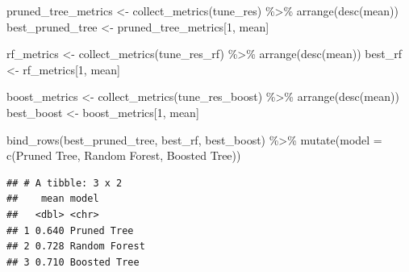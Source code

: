 \documentclass[
]{article}
\newenvironment{Shaded}{\begin{snugshade}}{\end{snugshade}}
\newcommand{\AttributeTok}[1]{\textcolor[rgb]{0.77,0.63,0.00}{#1}}
\newcommand{\DecValTok}[1]{\textcolor[rgb]{0.00,0.00,0.81}{#1}}
\newcommand{\FunctionTok}[1]{\textcolor[rgb]{0.00,0.00,0.00}{#1}}
\newcommand{\NormalTok}[1]{#1}
\newcommand{\OtherTok}[1]{\textcolor[rgb]{0.56,0.35,0.01}{#1}}
\newcommand{\SpecialCharTok}[1]{\textcolor[rgb]{0.00,0.00,0.00}{#1}}
\newcommand{\StringTok}[1]{\textcolor[rgb]{0.31,0.60,0.02}{#1}}
\begin{document}
\begin{Shaded}
\begin{Highlighting}[]
\NormalTok{pruned\_tree\_metrics }\OtherTok{\textless{}{-}} \FunctionTok{collect\_metrics}\NormalTok{(tune\_res) }\SpecialCharTok{\%\textgreater{}\%} \FunctionTok{arrange}\NormalTok{(}\FunctionTok{desc}\NormalTok{(mean))}
\NormalTok{best\_pruned\_tree }\OtherTok{\textless{}{-}}\NormalTok{ pruned\_tree\_metrics[}\DecValTok{1}\NormalTok{, }\StringTok{\textquotesingle{}mean\textquotesingle{}}\NormalTok{]}

\NormalTok{rf\_metrics }\OtherTok{\textless{}{-}} \FunctionTok{collect\_metrics}\NormalTok{(tune\_res\_rf) }\SpecialCharTok{\%\textgreater{}\%} \FunctionTok{arrange}\NormalTok{(}\FunctionTok{desc}\NormalTok{(mean))}
\NormalTok{best\_rf }\OtherTok{\textless{}{-}}\NormalTok{ rf\_metrics[}\DecValTok{1}\NormalTok{, }\StringTok{\textquotesingle{}mean\textquotesingle{}}\NormalTok{]}

\NormalTok{boost\_metrics }\OtherTok{\textless{}{-}} \FunctionTok{collect\_metrics}\NormalTok{(tune\_res\_boost) }\SpecialCharTok{\%\textgreater{}\%} \FunctionTok{arrange}\NormalTok{(}\FunctionTok{desc}\NormalTok{(mean))}
\NormalTok{best\_boost }\OtherTok{\textless{}{-}}\NormalTok{ boost\_metrics[}\DecValTok{1}\NormalTok{, }\StringTok{\textquotesingle{}mean\textquotesingle{}}\NormalTok{]}

\FunctionTok{bind\_rows}\NormalTok{(best\_pruned\_tree, best\_rf, best\_boost) }\SpecialCharTok{\%\textgreater{}\%} \FunctionTok{mutate}\NormalTok{(}\AttributeTok{model =} \FunctionTok{c}\NormalTok{(}\StringTok{\textquotesingle{}Pruned Tree\textquotesingle{}}\NormalTok{, }\StringTok{\textquotesingle{}Random Forest\textquotesingle{}}\NormalTok{, }\StringTok{\textquotesingle{}Boosted Tree\textquotesingle{}}\NormalTok{))}
\end{Highlighting}
\end{Shaded}

\begin{verbatim}
## # A tibble: 3 x 2
##    mean model        
##   <dbl> <chr>        
## 1 0.640 Pruned Tree  
## 2 0.728 Random Forest
## 3 0.710 Boosted Tree
\end{verbatim}
\end{document}
